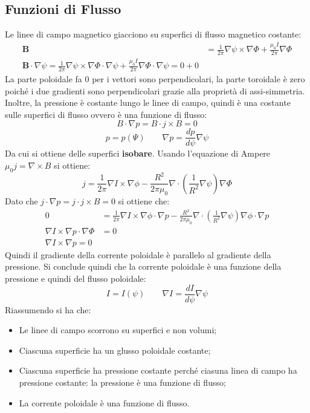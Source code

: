 \documentclass{article}
\begin{document}
\subsection{Funzioni di Flusso}
Le linee di campo magnetico giacciono su superfici di flusso magnetico costante:
\begin{align*}
	\mathbf{B} & =\frac{1}{2\pi }\nabla\psi\times\nabla\Phi+\frac{\mu_{0}I}{2\pi }\nabla\Phi \\
	\mathbf{B}\cdot\nabla\psi=\frac{1}{2\pi }\nabla\psi\times\nabla\Phi\cdot\nabla\psi+\frac{\mu_{0}I}{2\pi }\nabla\Phi\cdot\nabla\psi=0+0
\end{align*}
La parte poloidale fa 0 per i vettori sono perpendicolari, la parte toroidale è zero poiché i due gradienti sono perpendicolari grazie alla proprietà di assi-simmetria.
Inoltre, la pressione è costante lungo le linee di campo, quindi è una costante sulle superfici di flusso ovvero è una funzione di flusso:\begin{equation*}
	B\cdot\nabla p=B\cdot j\times B=0
\end{equation*}
\begin{equation*}
	p=p(\Psi)\quad\quad \nabla p=\frac{dp}{d\psi}\nabla\psi
\end{equation*}
Da cui si ottiene delle superfici \textbf{isobare}.
Usando l'equazione di Ampere \(\mu_{0}j=\nabla\times B\) si ottiene:\begin{equation*}
	j=\frac{1}{2\pi}\nabla I\times \nabla\phi-\frac{R^{2}}{2\pi\mu_{0}}\nabla\cdot\left(\frac{1}{R^{2}}\nabla \psi\right)\nabla\Phi
\end{equation*}
Dato che \(j\cdot\nabla p=j\cdot j\times B=0\) si ottiene che:\begin{align*}
	0                                     & =\frac{1}{2\pi}\nabla I\times \nabla\phi\cdot\nabla p-\frac{R^{2}}{2\pi\mu_{0}}\nabla\cdot\left(\frac{1}{R^{2}}\nabla\psi\right)\nabla\phi\cdot\nabla p \\
	\nabla I\times\nabla p\cdot\nabla\Phi & =0                                                                                                                                                      \\
	\nabla I\times\nabla p=0
\end{align*}
Quindi il gradiente della corrente poloidale è parallelo al gradiente della pressione. Si conclude quindi che la corrente poloidale è una funzione della pressione e quindi del flusso poloidale:\begin{equation*}
	I=I(\psi)\quad\quad \nabla I=\frac{dI}{d\psi}\nabla\psi
\end{equation*}
Riassumendo si ha che:\begin{itemize}
	\item Le linee di campo scorrono su superfici e non volumi;
	\item Ciascuna superficie ha un glusso poloidale costante;
	\item Ciascuna superficie ha pressione costante perché ciasuna linea di campo ha pressione costante: la pressione è una funzione di flusso;
	\item La corrente poloidale è una funzione di flusso.
\end{itemize}
\end{document}
